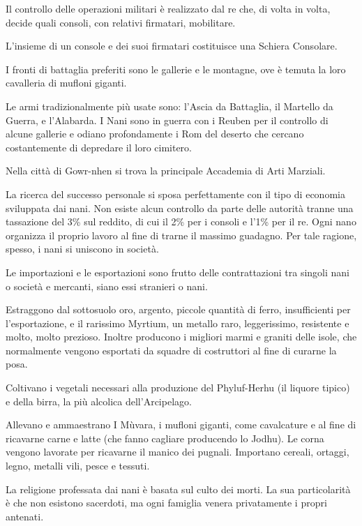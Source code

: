 Il controllo delle operazioni militari \`e realizzato dal re che, di
volta in volta, decide quali consoli, con relativi firmatari,
mobilitare.  

L'insieme di un console e dei suoi firmatari costituisce
una Schiera Consolare.  

I fronti di battaglia preferiti sono le
gallerie e le montagne, ove \`e temuta la loro cavalleria di mufloni
giganti. 

Le armi tradizionalmente pi\`u usate sono: l'Ascia da
Battaglia, il Martello da Guerra, e l'Alabarda. I Nani sono in guerra
con i Reuben per il controllo di alcune gallerie e odiano
profondamente i Rom del deserto che cercano costantemente di depredare
il loro cimitero.

Nella citt\`a di Gowr-nhen si trova la principale
Accademia di Arti Marziali.

\Economia La ricerca del successo personale si sposa perfettamente con il tipo
di economia sviluppata dai nani. Non esiste alcun controllo da parte
delle autorit\`a tranne una tassazione del 3\% sul reddito, di cui il 2\% per 
i consoli e l'1\% per il re. Ogni nano organizza il proprio lavoro al
fine di trarne il massimo guadagno. Per tale ragione, spesso, i nani
si uniscono in societ\`a.

Le importazioni e le esportazioni sono frutto delle contrattazioni tra
singoli nani o societ\`a e mercanti, siano essi stranieri o nani.

Estraggono dal sottosuolo oro, argento, piccole quantit\`a di
ferro, insufficienti per l'esportazione, e il rarissimo Myrtium, un
metallo raro, leggerissimo, resistente e molto, molto prezioso.
Inoltre producono i migliori marmi e graniti delle isole, che
normalmente vengono esportati da squadre di costruttori al fine
di curarne la posa.

Coltivano i vegetali necessari alla produzione
del Phyluf-Herhu (il liquore tipico) e della birra, la pi\`u
alcolica dell'Arcipelago.

Allevano e ammaestrano I M\`uvara, i mufloni giganti, come
cavalcature e al fine di ricavarne carne e latte (che fanno cagliare
producendo lo Jodhu).  Le corna vengono lavorate per ricavarne il
manico dei pugnali. Importano cereali, ortaggi, legno, metalli vili,
pesce e tessuti.

\Religione La religione professata dai nani \`e basata sul culto dei
morti. La sua particolarit\`a \`e che non esistono sacerdoti, ma ogni
famiglia venera privatamente i propri antenati.  

